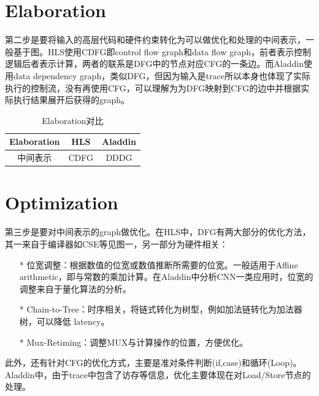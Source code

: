 \documentclass[UTF8]{scrartcl}
\begin{document}
	
	
\section{Elaboration}
	第二步是要将输入的高层代码和硬件约束转化为可以做优化和处理的中间表示，一般基于图。HLS使用CDFG即control flow graph和data flow graph，前者表示控制逻辑后者表示计算，两者的联系是DFG中的节点对应CFG的一条边。而Aladdin使用data dependency graph，类似DFG，但因为输入是trace所以本身也体现了实际执行的控制流，没有再使用CFG，可以理解为为DFG映射到CFG的边中并根据实际执行结果展开后获得的graph。

		\begin{table}[h]
			\centering
			\caption{Elaboration对比}
			\begin{tabular*}{8cm}{c |c|c }
				\hline
				Elaboration  &  HLS  & Aladdin   \\
				\hline
				中间表示& CDFG & DDDG \\
				\hline
			\end{tabular*}	
		\end{table}
	
\section{Optimization}

	第三步是要对中间表示的graph做优化。在HLS中，DFG有两大部分的优化方法，其一来自于编译器如CSE等见图一，另一部分为硬件相关：
	
	\begin{itemize}
		
		\item[*] 位宽调整：根据数值的位宽或数值推断所需要的位宽。一般适用于Affine arithmetic，即与常数的乘加计算。在Aladdin中分析CNN一类应用时，位宽的调整来自于量化算法的分析。
		\item[*] Chain-to-Tree：时序相关，将链式转化为树型，例如加法链转化为加法器树，可以降低 latency。
		\item[*] Mux-Retiming：调整MUX与计算操作的位置，方便优化。
				
	\end{itemize}

	此外，还有针对CFG的优化方式，主要是准对条件判断(if,case)和循环(Loop)。 Aladdin中，由于trace中包含了访存等信息，优化主要体现在对Load/Store节点的处理。
	
\end{document}
